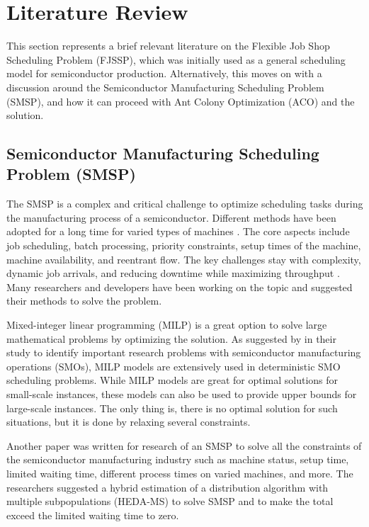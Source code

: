 \section{Literature Review}
This section represents a brief relevant literature on the Flexible Job Shop Scheduling Problem (FJSSP), which was initially used as a general scheduling model for semiconductor production. Alternatively, this moves on with a discussion around the Semiconductor Manufacturing Scheduling Problem (SMSP), and how it can proceed with Ant Colony Optimization (ACO) and the solution.
\subsection{Semiconductor Manufacturing Scheduling Problem (SMSP)}
The SMSP is a complex and critical challenge to optimize scheduling tasks during the manufacturing process of a semiconductor. Different methods have been adopted for a long time for varied types of machines \cite{chan2024situation}. The core aspects include job scheduling, batch processing, priority constraints, setup times of the machine, machine availability, and reentrant flow. The key challenges stay with complexity, dynamic job arrivals, and reducing downtime while maximizing throughput \cite{el2023hybrid}. Many researchers and developers have been working on the topic and suggested their methods to solve the problem.
\vspace{1em}

Mixed-integer linear programming (MILP) is a great option to solve large mathematical problems by optimizing the solution. As suggested by \cite{fang2023problems} in their study to identify important research problems with semiconductor manufacturing operations (SMOs), MILP models are extensively used in deterministic SMO scheduling problems. While MILP models are great for optimal solutions for small-scale instances, these models can also be used to provide upper bounds for large-scale instances. The only thing is, there is no optimal solution for such situations, but it is done by relaxing several constraints. 
\vspace{1em}

Another paper \cite{wang2014hybrid} was written for research of an SMSP to solve all the constraints of the semiconductor manufacturing industry such as machine status, setup time, limited waiting time, different process times on varied machines, and more. The researchers suggested a hybrid estimation of a distribution algorithm with multiple subpopulations (HEDA-MS) to solve SMSP and to make the total exceed the limited waiting time to zero.
